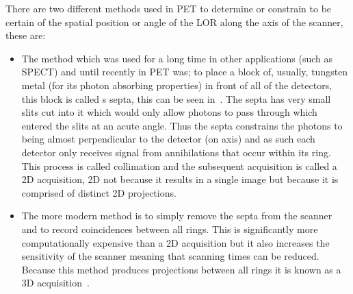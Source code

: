                 There are two different methods used in \gls{PET} to determine or constrain to be certain of the spatial position or angle of the \gls{LOR} along the axis of the scanner, these are:
                
                \begin{itemize}
                    \item The method which was used for a long time in other applications (such as \gls{SPECT}) and until recently in \gls{PET} was; to place a block of, usually, tungsten metal (for its photon absorbing properties) in front of all of the detectors, this block is called s septa, this can be seen in~. The septa has very small slits cut into it which would only allow photons to pass through which entered the slits at an acute angle. Thus the septa constrains the photons to being almost perpendicular to the detector (on axis) and as such each detector only receives signal from annihilations that occur within its ring. This process is called collimation and the subsequent acquisition is called a \gls{2D} acquisition, \gls{2D} not because it results in a single image but because it is comprised of distinct \gls{2D} projections.
                    
                    \item The more modern method is to simply remove the septa from the scanner and to record coincidences between all rings. This is significantly more computationally expensive than a \gls{2D} acquisition but it also increases the sensitivity of the scanner meaning that scanning times can be reduced. Because this method produces projections between all rings it is known as a \gls{3D} acquisition~.
                \end{itemize}
            
